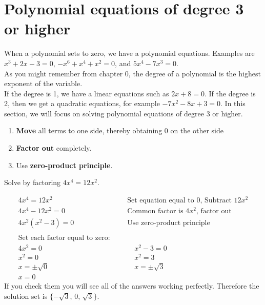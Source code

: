 \section{Polynomial equations of degree 3 or higher}
When a polynomial sets to zero, we have a polynomial equations. Examples are $x^3+2x-3=0$, $-x^6+x^4+x^2=0$, and $5x^4-7x^3=0$.\\
As you might remember from chapter 0, the degree of a polynomial is the highest exponent of the variable. \\
If the degree is 1, we have a linear equations such as $2x+8=0$. If the degree is 2, then we get a quadratic equations, for example $-7x^2-8x+3=0$. In this section, we will focus on solving polynomial equations of degree 3 or higher.
\vspace{0.2cm}
\begin{tcolorbox}[title=Solving a polynomial equations by factoring, 
colback=blue!5!white,
colframe=blue!75!black,
fonttitle=\bfseries]
\begin{enumerate}
    \item \textbf{Move} all terms to one side, thereby obtaining $0$ on the other side
    \item \textbf{Factor out} completely.
    \item Use \textbf{zero-product principle}.
\end{enumerate}
\end{tcolorbox}
\begin{exa}
 Solve by factoring $4x^4=12x^2$.
\end{exa}
\begin{align*}
            4x^4=12x^2& &   &\text{Set equation equal to 0, Subtract $12x^2$}\\
            4x^4-12x^2=0&   &   &\text{Common factor is $4x^2$, factor out}\\
            4x^2(x^2-3)=0&    &   &\text{Use zero-product principle}\\
            &&&\\
            \text{Set each factor equal to zero:}&&&\\
            4x^2=0& &   &\quad x^2-3=0\\
            x^2=0&    &   &\quad x^2=3\\
            x=\pm \sqrt{0}& &  &\quad x=\pm \sqrt{3}\\
            x=0&    &   &
\end{align*}    
If you check them you will see all of the answers working perfectly. Therefore the solution set is $\{-\sqrt{3},\,0,\,\sqrt{3} \}$.
